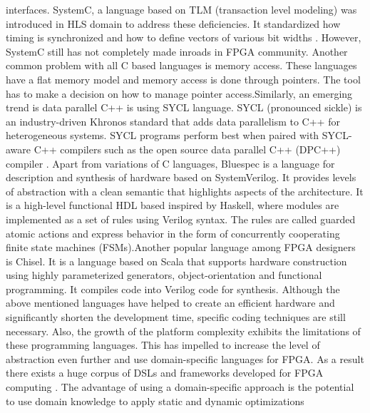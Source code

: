 interfaces. SystemC, a language based on TLM (transaction level modeling) was introduced in HLS domain to address these deficiencies. It standardized how timing is synchronized and how to define vectors of various bit widths \cite{6838614}. However, SystemC still has not completely made inroads in FPGA community. Another common problem with all C based languages is memory access. These languages have a flat memory model and memory access is done through pointers. The tool has to make a decision on how to manage pointer access.\newline Similarly, an emerging trend is data parallel C++ is using SYCL language. SYCL (pronounced sickle) is an industry-driven Khronos \cite{} standard that adds data parallelism to C++ for heterogeneous systems. SYCL programs perform best when paired with SYCL-aware C++ compilers such as the open source data parallel C++ (DPC++) compiler \cite{dpcplus}.
Apart from variations of C languages, Bluespec is a language for description and synthesis of hardware based on SystemVerilog. It provides levels of abstraction with a clean semantic that highlights aspects of the architecture. It is a high-level functional HDL based inspired by Haskell, where modules are implemented as a set of rules
using Verilog syntax. The rules are called guarded atomic
actions and express behavior in the form of concurrently cooperating
finite state machines (FSMs).\newline Another popular language among FPGA designers is Chisel. It is a language based on Scala that supports hardware construction using highly parameterized generators, object-orientation and functional programming. It compiles code into Verilog code for synthesis. \newline Although the above mentioned languages have helped to create an efficient hardware and significantly shorten the development time, specific coding techniques are still necessary. Also, the growth of the platform complexity exhibits the limitations of these programming languages.
This has impelled to increase the level of abstraction even further and use domain-specific languages for FPGA. As a result there exists a huge corpus of DSLs and frameworks developed for FPGA computing \cite{7577380, transparent}. The advantage of using a domain-specific approach is the potential to use domain knowledge to apply static and dynamic optimizations
